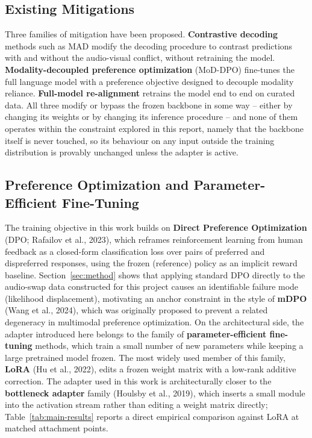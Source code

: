 \documentclass[11pt,a4paper,oneside]{article}
\begin{document}
\subsection{Existing Mitigations}

Three families of mitigation have been proposed. \textbf{Contrastive decoding} methods such as MAD
modify the decoding procedure to contrast predictions with and without the audio-visual conflict,
without retraining the model. \textbf{Modality-decoupled preference optimization} (MoD-DPO) fine-tunes
the full language model with a preference objective designed to decouple modality reliance.
\textbf{Full-model re-alignment} retrains the model end to end on curated data. All three modify or
bypass the frozen backbone in some way -- either by changing its weights or by changing its inference
procedure -- and none of them operates within the constraint explored in this report, namely that the
backbone itself is never touched, so its behaviour on any input outside the training distribution is
provably unchanged unless the adapter is active.

\subsection{Preference Optimization and Parameter-Efficient Fine-Tuning}

The training objective in this work builds on \textbf{Direct Preference Optimization} (DPO;
Rafailov et al., 2023), which reframes reinforcement learning from human feedback as a closed-form
classification loss over pairs of preferred and dispreferred responses, using the frozen (reference)
policy as an implicit reward baseline. Section~\ref{sec:method} shows that applying standard DPO
directly to the audio-swap data constructed for this project causes an identifiable failure mode
(likelihood displacement), motivating an anchor constraint in the style of \textbf{mDPO}
(Wang et al., 2024), which was originally proposed to prevent a related degeneracy in multimodal
preference optimization. On the architectural side, the adapter introduced here belongs to the family
of \textbf{parameter-efficient fine-tuning} methods, which train a small number of new parameters
while keeping a large pretrained model frozen. The most widely used member of this family,
\textbf{LoRA} (Hu et al., 2022), edits a frozen weight matrix with a low-rank additive correction.
The adapter used in this work is architecturally closer to the \textbf{bottleneck adapter} family
(Houlsby et al., 2019), which inserts a small module into the activation stream rather than editing a
weight matrix directly; Table~\ref{tab:main-results} reports a direct empirical comparison against
LoRA at matched attachment points.
\end{document}
